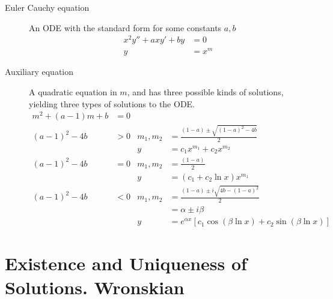 \begin{description}
    \item[Euler Cauchy equation] An ODE with the standard form for some constants $ a, b $
        \begin{align}
            x^{2}y'' + axy' + by & = 0     \\
            y                    & = x^{m}
        \end{align}
    \item[Auxiliary equation] A quadratic equation in $ m $, and has three possible kinds of
        solutions, yielding three types of solutions to the ODE.
        \begin{align}
            m^{2} + (a-1)m + b & = 0                                                                                               \\[2em]
            (a-1)^{2} - 4b     & > 0 & m_{1}, m_{2} & = \frac{(1-a) \pm \sqrt{(1-a)^{2} - 4b}}{2}                                  \\
                               &     & y            & = c_{1}x^{m_{1}} + c_{2}x^{m_{2}}                                            \\[2em]
            (a-1)^{2} - 4b     & = 0 & m_{1}, m_{2} & = \frac{(1-a)}{2}                                                            \\
                               &     & y            & = \left( c_{1} + c_{2}\ln x \right)  x^{m_{1}}                               \\[2em]
            (a-1)^{2} - 4b     & < 0 & m_{1}, m_{2} & = \frac{(1-a) \pm i\sqrt{4b - (1-a)^{2}}}{2}                                 \\
                               &     &              & =  \alpha \pm i\beta                                                         \\
                               &     & y            & = e^{\alpha x}\left[c_{1}\cos (\beta \ln x) + c_{2}\sin (\beta \ln x)\right]
        \end{align}
\end{description}

\section{Existence and Uniqueness of Solutions. Wronskian}

